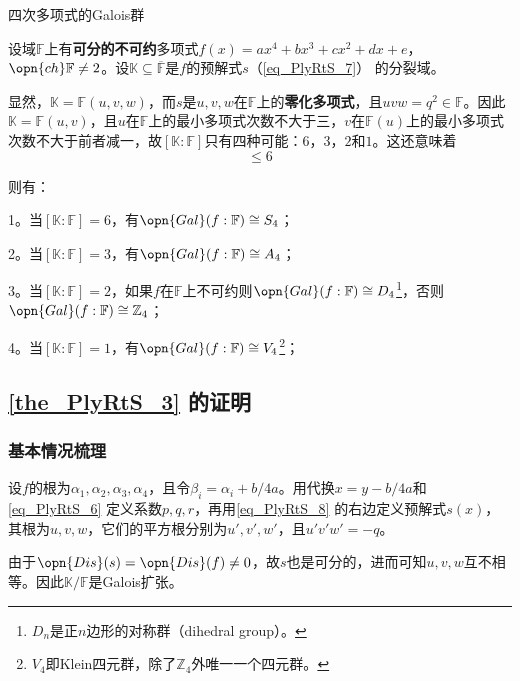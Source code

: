 \begin{theorem}{四次多项式的Galois群}\label{the_PlyRtS_3}

设域$\mathbb{F}$上有\textbf{可分的不可约}多项式$f(x)=ax^4+bx^3+cx^2+dx+e$，$\opn{ch}\mathbb{F}\neq 2$。设$\mathbb{K}\subseteq\overline{\mathbb{F}}$是$f$的预解式$s$（\autoref{eq_PlyRtS_7}） 的分裂域。

显然，$\mathbb{K}=\mathbb{F}(u, v, w)$，而$s$是$u, v, w$在$\mathbb{F}$上的\textbf{零化多项式}，且$uvw=q^2\in\mathbb{F}$。因此$\mathbb{K}=\mathbb{F}(u, v)$，且$u$在$\mathbb{F}$上的最小多项式次数不大于三，$v$在$\mathbb{F}(u)$上的最小多项式次数不大于前者减一，故$[\mathbb{K}:\mathbb{F}]$只有四种可能：$6$，$3$，$2$和$1$。这还意味着
\begin{equation}
[\mathbb{K}:\mathbb{F}]\leq 6
\end{equation}

则有：

1。当$[\mathbb{K}:\mathbb{F}]=6$，有$\opn{Gal}(f:\mathbb{F})\cong S_4$；

2。当$[\mathbb{K}:\mathbb{F}]=3$，有$\opn{Gal}(f:\mathbb{F})\cong A_4$；

3。当$[\mathbb{K}:\mathbb{F}]=2$，如果$f$在$\mathbb{F}$上不可约则$\opn{Gal}(f:\mathbb{F})\cong D_4$\footnote{$D_n$是正$n$边形的对称群（dihedral group）。}，否则$\opn{Gal}(f:\mathbb{F})\cong \mathbb{Z}_4$；

4。当$[\mathbb{K}:\mathbb{F}]=1$，有$\opn{Gal}(f:\mathbb{F})\cong V_4$\footnote{$V_4$即Klein四元群，除了$\mathbb{Z}_4$外唯一一个四元群。}；

\end{theorem}

\subsection{\autoref{the_PlyRtS_3} 的证明}

\subsubsection{基本情况梳理}


设$f$的根为$\alpha_1, \alpha_2, \alpha_3, \alpha_4$，且令$\beta_i=\alpha_i+b/4a$。用代换$x=y-b/4a$和\autoref{eq_PlyRtS_6} 定义系数$p, q, r$，再用\autoref{eq_PlyRtS_8}  的右边定义预解式$s(x)$，其根为$u, v, w$，它们的平方根分别为$u', v', w'$，且$u'v'w'=-q$。

由于$\opn{Dis}(s)=\opn{Dis}(f)\neq 0$，故$s$也是可分的，进而可知$u, v, w$互不相等。因此$\mathbb{K}/\mathbb{F}$是Galois扩张。

